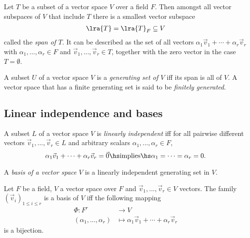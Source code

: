 \documentclass{article}
\begin{document}
\begin{proposition}[Notes 1.4.5]
	Let $T$ be a subset of a vector space $V$ over a field $F$. Then amongst all
	vector subspaces of $V$ that include $T$ there is a smallest vector subspace
	\begin{align*}
		\lra{T} = \lra{T}_F\subseteq V
	\end{align*}
	called the \emph{span of $T$}.
	It can be described as the set of all vectors $\alpha_1\vec v_1+\cdots+\alpha_r\vec v_r$
	with $\alpha_1,...,\alpha_r\in F$ and $\vec v_1,...,\vec v_r\in T$, together
	with the zero vector in the case $T=\emptyset$.
\end{proposition}

\begin{definition}
	A subset $U$ of a vector space $V$ is a \emph{generating set of $V$}
	iff its span is all of $V$. A vector space that has a finite generating set
	is said to be \emph{finitely generated}.
\end{definition}

\subsection{Linear independence and bases}

\begin{definition}
	A subset $L$ of a vector space $V$ is \emph{linearly independent}
	iff for all pairwise different vectors $\vec v_1,...,\vec v_r\in L$ and
	arbitrary scalars $\alpha_1,...,\alpha_r\in F$,
	\begin{align*}
		\alpha_1\vec v_1+\cdots+\alpha_r\vec v_r = \vec 0
		\hs\text{implies}\hs
		\alpha_1=\cdots=\alpha_r=0.
	\end{align*}
\end{definition}

\begin{definition}
	A \emph{basis of a vector space} $V$ is a linearly independent generating
	set in $V$.
\end{definition}

\begin{theorem}[Notes 1.5.11]
	Let $F$ be a field, $V$ a vector space over $F$ and $\vec v_1,...,\vec v_r\in V$
	vectors. The family $\left(\vec v_i\right)_{1\leq i\leq r}$ is a basis of $V$
	iff the following mapping
	\begin{align*}
		\Phi:F^r                & \to V                                                \\
		(\alpha_1,...,\alpha_r) & \mapsto \alpha_1\vec v_1 + \cdots + \alpha_r\vec v_r
	\end{align*}
	is a bijection.
\end{theorem}
\end{document}
